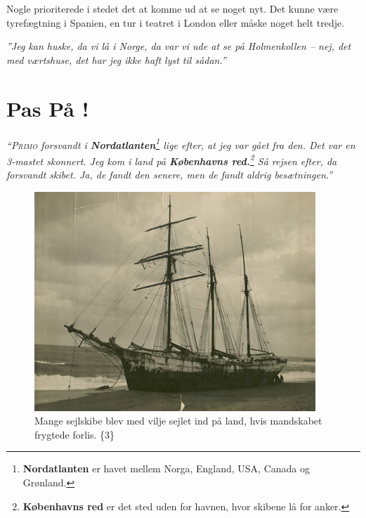 Nogle prioriterede i stedet det at komme ud at se noget nyt. Det kunne
være tyrefægtning i Spanien, en tur i teatret i London eller måske noget
helt tredje.

\emph{''Jeg kan huske, da vi lå i Norge, da var vi ude at se på
Holmenkollen -- nej, det med værtshuse, det har jeg ikke haft lyst til
sådan.''}

\chapter{Pas På !}

\emph{``\textsc{Primo} forsvandt i \textbf{Nordatlanten}\footnote{\textbf{Nordatlanten}
  er havet mellem Norga, England, USA, Canada og Grønland.} lige efter,
at jeg var gået fra den. Det var en 3-mastet skonnert. Jeg kom i land på
\textbf{Københavns red.}\footnote{\textbf{Københavns red} er det sted
  uden for havnen, hvor skibene lå for anker.} Så rejsen efter, da
forsvandt skibet. Ja, de fandt den senere, men de fandt aldrig
besætningen.''}

\begin{figure}
\centering
\includegraphics{images/sejlskibe_tema-6-forlis.jpg}
\caption{Mange sejlskibe blev med vilje sejlet ind på land, hvis
mandskabet frygtede forlis. \{3\}}
\end{figure}

